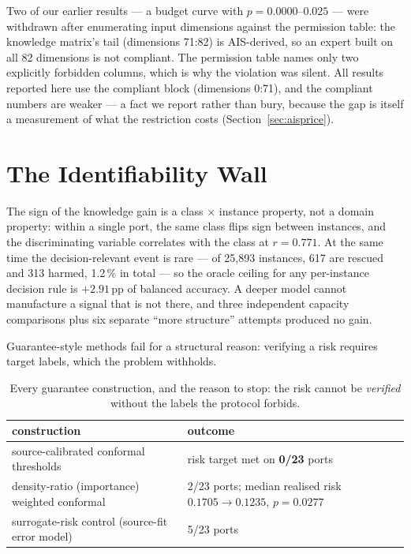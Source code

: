\documentclass[journal]{IEEEtran}
\begin{document}
Two of our earlier results --- a budget curve with $p = 0.0000$--$0.025$ --- were withdrawn after
enumerating input dimensions against the permission table: the knowledge matrix's tail (dimensions
71:82) is AIS-derived, so an expert built on all 82 dimensions is not compliant. The permission table
names only two explicitly forbidden columns, which is why the violation was silent. All results
reported here use the compliant block (dimensions 0:71), and the compliant numbers are weaker --- a
fact we report rather than bury, because the gap is itself a measurement of what the restriction costs
(Section~\ref{sec:aisprice}).

\section{The Identifiability Wall}
\label{sec:wall}

The sign of the knowledge gain is a class $\times$ instance property, not a domain property: within a
single port, the same class flips sign between instances, and the discriminating variable correlates
with the class at $r = 0.771$. At the same time the decision-relevant event is rare --- of 25{,}893
instances, 617 are rescued and 313 harmed, 1.2\,\% in total --- so the oracle ceiling for any
per-instance decision rule is $+2.91$\,pp of balanced accuracy. A deeper model cannot manufacture a
signal that is not there, and three independent capacity comparisons plus six separate ``more
structure'' attempts produced no gain.

Guarantee-style methods fail for a structural reason: verifying a risk requires target labels, which
the problem withholds.

\begin{table}[t]
\caption{Every guarantee construction, and the reason to stop: the risk cannot be \emph{verified}
without the labels the protocol forbids.}
\label{tab:guarantee}
\centering
\footnotesize
\begin{tabular}{@{}L{3.4cm}L{4.3cm}@{}}
\toprule
construction & outcome \\
\midrule
source-calibrated conformal thresholds \cite{tibshirani2019conformal} & risk target met on \textbf{0/23} ports \\
density-ratio (importance) weighted conformal \cite{tibshirani2019conformal} & 2/23 ports; median realised risk $0.1705 \rightarrow 0.1235$, $p = 0.0277$ \\
surrogate-risk control (source-fit error model) \cite{angelopoulos2024riskcontrol} & 5/23 ports \\
\bottomrule
\end{tabular}
\end{table}
\end{document}
